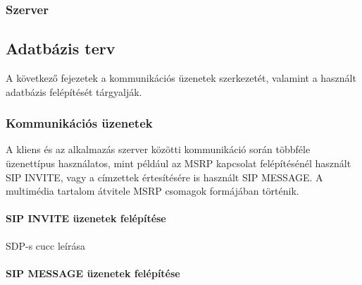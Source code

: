 \subsubsection{Szerver}
\label{sec:szerverinterfesz}

\subsection{Adatbázis terv}

A következő fejezetek a kommunikációs üzenetek szerkezetét, valamint a használt adatbázis felépítését tárgyalják.

\subsubsection{Kommunikációs üzenetek}
\label{sec:komm_uzenetek}

A kliens és az alkalmazás szerver közötti kommunikáció során többféle üzenettípus használatos, mint például az MSRP kapcsolat felépítésénél használt SIP INVITE, vagy a címzettek értesítésére is használt SIP MESSAGE. A multimédia tartalom átvitele MSRP csomagok formájában történik.  

\paragraph{SIP INVITE üzenetek felépítése\\}
\label{sec:sip_invite}

SDP-s cucc leírása

\paragraph{SIP MESSAGE üzenetek felépítése\\}
\label{sec:sip_message}

